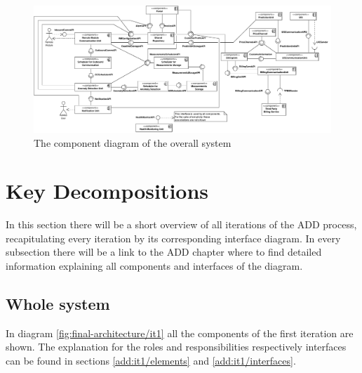 \begin{figure}
	\begin{centering}
		\includegraphics[height=\textwidth,angle=90]{figs/final-component.pdf}
		\caption{The component diagram of the overall system}
		\label{fig:final-components}
	\end{centering}
\end{figure}

\section{Key Decompositions}

\npar In this section there will be a short overview of all iterations of the
ADD process, recapitulating every iteration by its corresponding interface
diagram. In every subsection there will be a link to the ADD chapter where to
find detailed information explaining all components and interfaces of the
diagram.

\subsection{Whole system}

\npar In diagram \ref{fig:final-architecture/it1} all the components of the
first iteration are shown. The explanation for the roles and responsibilities
respectively interfaces can be found in sections \ref{add:it1/elements} and
\ref{add:it1/interfaces}.

